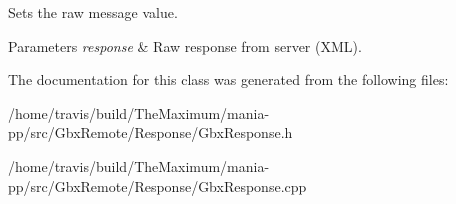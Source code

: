 Sets the raw message value. 


\begin{DoxyParams}{Parameters}
{\em response} & Raw response from server (X\-M\-L). \\
\hline
\end{DoxyParams}


The documentation for this class was generated from the following files\-:\begin{DoxyCompactItemize}
\item 
/home/travis/build/\-The\-Maximum/mania-\/pp/src/\-Gbx\-Remote/\-Response/Gbx\-Response.\-h\item 
/home/travis/build/\-The\-Maximum/mania-\/pp/src/\-Gbx\-Remote/\-Response/Gbx\-Response.\-cpp\end{DoxyCompactItemize}

